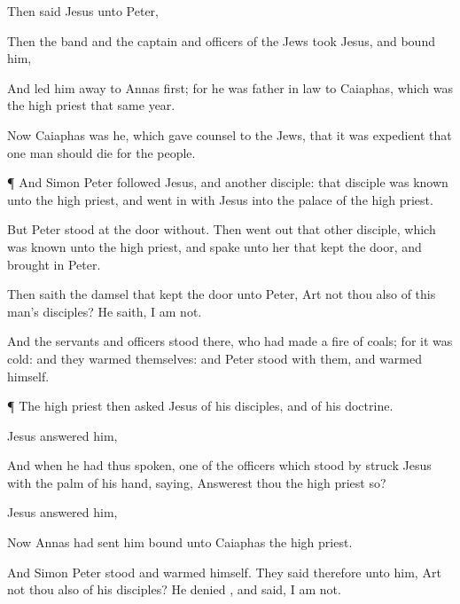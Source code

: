 {Then
said
Jesus unto
Peter,
{}

Then the
band
and the
captain
and
officers of the
Jews
took
Jesus,
and
bound
him,

And
led
him
away
to
Annas
first;
for he
was father in
law to
Caiaphas,
which
was the high
priest that
same
year.

Now
Caiaphas
was he,
which gave
counsel to the
Jews,
that it was expedient
that
one
man should
die
for the
people.


\par }{\PP {}¶
And
Simon
Peter
followed
Jesus,
and
{}
another
disciple:
that
disciple
was
known unto the high
priest,
and went in
with
Jesus
into the
palace of the high
priest.

But
Peter
stood
at the
door
without.
Then went
out
that
other
disciple,
which
was
known unto the high
priest,
and
spake unto her that kept the
door,
and brought
in
Peter.

Then
saith the
damsel
that kept the
door unto
Peter,
Art
not
thou
also
{}
of
this
man’s
disciples? He
saith, I
am
not.

And the
servants
and
officers stood
there, who had
made a fire of
coals;
for it
was
cold:
and they warmed
themselves:
and
Peter
stood
with
them,
and warmed
himself.


\par }{\PP {}¶ The high
priest
then
asked
Jesus
of
his
disciples,
and
of
his
doctrine.

Jesus
answered
him,
{}


And
when
he
had
thus
spoken,
one of the
officers which stood
by
struck
Jesus with the palm of his
hand,
saying, Answerest
thou the high
priest
so?

Jesus
answered
him,
{}

Now
Annas had
sent
him
bound
unto
Caiaphas the high
priest.

And
Simon
Peter
stood
and warmed
himself. They
said
therefore unto
him,
Art
not
thou
also
{}
of
his
disciples?
He
denied
{},
and
said, I
am
not.

}
